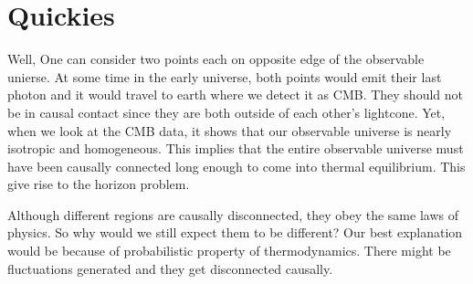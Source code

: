 \section{Quickies}
Well, One can consider two points each on opposite edge of the observable unierse. At some time in the early universe, both points would emit their last photon and it would travel to earth where we detect it as CMB. They should not be in causal contact since they are both outside of each other's lightcone. Yet, when we look at the CMB data, it shows that our observable  universe is nearly isotropic and homogeneous. This implies that the entire observable universe must have been causally connected long enough to come into thermal equilibrium. This give rise to the horizon problem. 

Although different regions are causally disconnected, they obey the same laws of physics. So why would we still expect them to be different? Our best explanation would be because of probabilistic property of thermodynamics. There might be fluctuations generated and they get disconnected causally.

